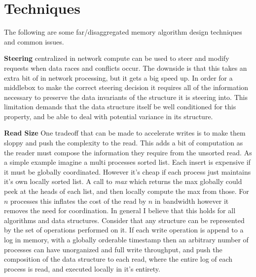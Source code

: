 

%


\section{Techniques}

The following are some far/disaggregated memory algorithm design techniques and
common issues.


\textbf{Steering} centralized in network compute can be used to steer and modify
requests when data races and conflicts occur. The downside is that this takes an
extra bit of in network processing, but it gets a big speed up. In order for a
middlebox to make the correct steering decision it requires all of the
information necessary to preserve the data invariants of the structure it is
steering into. This limitation demands that the data structure itself be well
conditioned for this property, and be able to deal with potential variance in
its structure.

\textbf{Read Size} One tradeoff that can be made to accelerate writes is to make
them sloppy and push the complexity to the read. This adds a bit of computation
as the reader must compose the information they require from the unsorted read.
As a simple example imagine a multi processes sorted list. Each insert is
expensive if it must be globally coordinated. However it's cheap if each process
just maintains it's own locally sorted list. A call to \textit{max} which
returns the max globally could peek at the heads of each list, and then locally
compute the max from those. For $n$ processes this inflates the cost of the read
by $n$ in bandwidth however it removes the need for coordination. In general I
believe that this holds for all algorithms and data structures. Consider that any
structure can be represented by the set of operations performed on it. If each
write operation is append to a log in memory, with a globally orderable
timestamp then an arbitrary number of processes can have unorganized and full
write throughput, and push the composition of the data structure to each read,
where the entire log of each process is read, and executed locally in it's
entirety.

